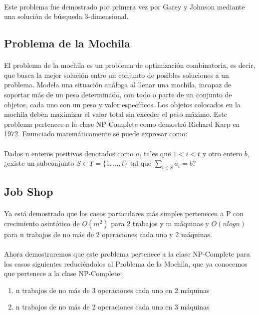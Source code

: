 \documentclass[11pt, a4paper,spanish]{article}
\begin{document}
				\paragraph{}
				Este problema fue demostrado por primera vez por Garey y Johnson mediante una solución de búsqueda 3-dimensional.
		
			\subsection{Problema de la Mochila}
				
				\paragraph{}
				El problema de la mochila es un problema de optimización combinatoria, es decir, que busca la mejor solución entre un conjunto de posibles soluciones a un problema. Modela una situación análoga al llenar una mochila, incapaz de soportar más de un peso determinado, con todo o parte de un conjunto de objetos, cada uno con un peso y valor específicos. Los objetos colocados en la mochila deben maximizar el valor total sin exceder el peso máximo. Este problema pertenece a la clase NP-Complete como demostró  Richard Karp en 1972. Enunciado matemáticamente se puede expresar como: 
				
				\paragraph{}
				Dados n enteros positivos denotados como $a_{i}$ tales que $1 < i < t$ y otro entero $b$, ¿existe un subconjunto $S \in T = \{1,...,t\} $ tal que $\sum_{i\in S}a_{i}= b$?
				
				
				
			\subsection{Job Shop}
			
				\paragraph{}
				 Ya está demostrado que los casos particulares más simples pertenecen a P con crecimiento asintótico de $O(m^2)$ para 2 trabajos y m máquinas y $O(n logn)$ para n trabajos de no más de 2 operaciones cada uno y 2 máquinas. 
				 
				\paragraph{}
				 Ahora demostraremos que este problema pertenece a la clase NP-Complete para los casos siguientes reduciéndolos al Problema de la Mochila, que ya conocemos que pertenece a la clase NP-Complete:
				 \begin{enumerate}
				  	\item n trabajos de no más de 3 operaciones cada uno en 2 máquinas
				 	\item n trabajos de no más de 2 operaciones cada uno en 3 máquinas
				 \end {enumerate}
\end{document}

